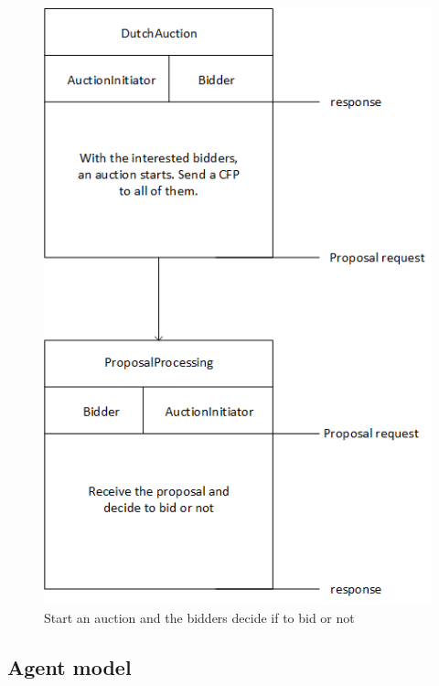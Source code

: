 \documentclass[a4paper, 11pt]{article}
\begin{document}
\begin{figure}[H]
	\caption{Start an auction and the bidders decide if to bid or not}
	\centering
	\includegraphics[scale=0.8]{./images/interaction-cfp.png}
\end{figure}

\subsection{Agent model}
\end{document}
